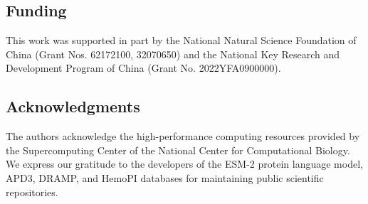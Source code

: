 \documentclass[11pt,a4paper]{article}
\begin{document}
\subsection*{Funding}
This work was supported in part by the National Natural Science Foundation of China (Grant Nos. 62172100, 32070650) and the National Key Research and Development Program of China (Grant No. 2022YFA0900000).

\subsection*{Acknowledgments}
The authors acknowledge the high-performance computing resources provided by the Supercomputing Center of the National Center for Computational Biology. We express our gratitude to the developers of the ESM-2 protein language model, APD3, DRAMP, and HemoPI databases for maintaining public scientific repositories.



\end{document}

